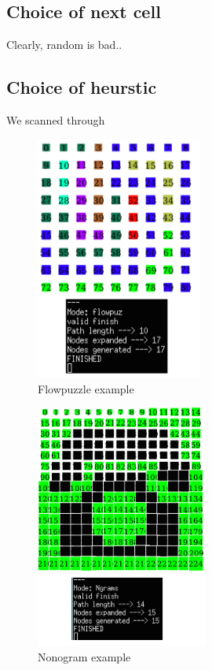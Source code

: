 \documentclass[journal]{IEEEtran}
\begin{document}
\subsection{Choice of next cell}
Clearly, random is bad..

\subsection{Choice of heurstic}
We scanned through 

\begin{figure}[Hb]
\centering
    \includegraphics[keepaspectratio, height=8cm]{flowpuz.png}
\caption{Flowpuzzle example}
\label{fig:Flowpuzzle}
\end{figure}

\begin{figure}[Hb]
\centering
    \includegraphics[keepaspectratio, height=8cm]{ngram.png}
\caption{Nonogram example}
\label{fig:Nonogram}
\end{figure}
\end{document}
